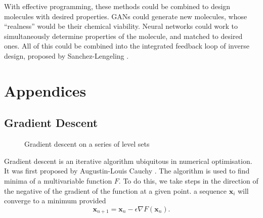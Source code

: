 \documentclass[12pt,a4paper]{article}
\begin{document}
With effective programming, these methods could be combined to design molecules with desired properties. GANs could generate new molecules, whose \enquote{realness} would be their chemical viability. Neural networks could work to simultaneously determine properties of the molecule, and matched to desired ones. All of this could be combined into the integrated feedback loop of inverse design, proposed by Sanchez-Lengeling \cite{sanchez-lengeling_inverse_2018}.

\printbibliography[]

\section{Appendices}
\subsection{Gradient Descent} \label{app:gradient}
\begin{figure}
\vspace{-1cm}
\caption*{\centering Gradient descent on a series of level sets}
\end{figure}
Gradient descent is an iterative algorithm ubiquitous in numerical optimisation. It was first proposed by Augustin-Louis Cauchy  \cite{lemarechal_cauchy_2012}. The algorithm is used to find minima of a multivariable function $F$. To do this, we take steps in the direction of the negative of the gradient of the function at a given point.
a sequence $\textbf{x}_i$ will converge to a minimum provided
\begin{equation}
    \textbf{x}_{n+1} = \textbf{x}_n - \epsilon \nabla F(\textbf{x}_n).
\end{equation}
\end{document}
